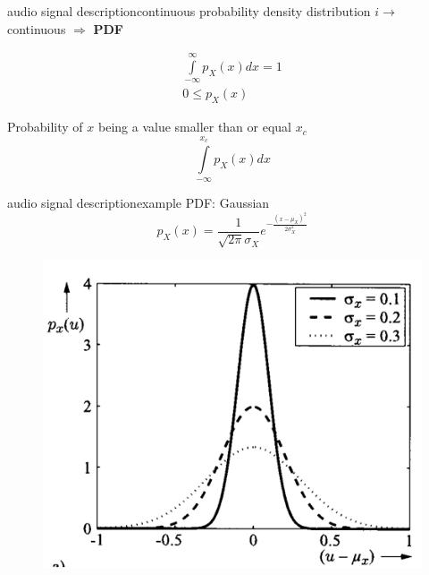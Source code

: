 \begin{frame}{audio signal description}{continuous probability density distribution}
	$i\rightarrow$ continuous $\Rightarrow$ \textbf{PDF} 

	\pause
	\begin{eqnarray}
		\int\limits_{-\infty}^{\infty} p_X(x)dx = 1\\
		0 \leq p_X(x)
	\end{eqnarray}		

	\pause
	Probability of $x$ being a value smaller than or equal $x_c$
				\begin{equation}
					\int\limits_{-\infty}^{x_c} p_X(x)dx
				\end{equation}		
\end{frame}	
	
\begin{frame}{audio signal description}{example PDF: Gaussian}
	\begin{equation} \label{gaussverteilung}
		p_X(x)= \frac{1}{\sqrt{2\pi}\sigma_X}e^{-\frac{(x-\mu_X)^2}{2\sigma_X^2}}
	\end{equation}
	\begin{figure}
		\centering
			\includegraphics[scale=.5]{graph/gaussdist}
	\end{figure}
\end{frame}	

